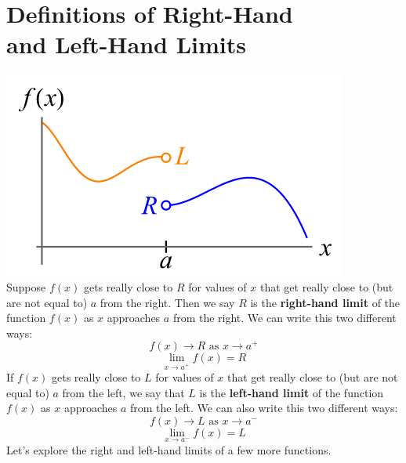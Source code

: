 \documentclass{article}
\begin{document}
\section{Definitions of Right-Hand \\and Left-Hand Limits}
\includegraphics[scale = 1]{Images/RightLeft1.png}\\
Suppose $f(x)$ gets really close to $R$ for values of $x$ that get really close to (but are not equal to)
$a$ from the right. Then we say $R$ is the \textbf{right-hand limit} of the function $f(x)$ as $x$
approaches $a$ from the right. We can write this two different ways:
\[f(x) \rightarrow R \text{ as } x \rightarrow a^{+}\]
\[\underset{x \rightarrow a^{+}}{\lim} f(x) = R\]
If $f(x)$ gets really close to $L$ for values of $x$ that get really close to (but are not equal to) $a$
from the left, we say that $L$ is the \textbf{left-hand limit} of the function $f(x)$ as $x$ approaches
$a$ from the left. We can also write this two different ways:
\[f(x) \rightarrow L \text{ as } x \rightarrow a^{-}\]
\[\underset{x \rightarrow a^{-}}{\lim} f(x) = L\]
Let's explore the right and left-hand limits of a few more functions.
\end{document}
